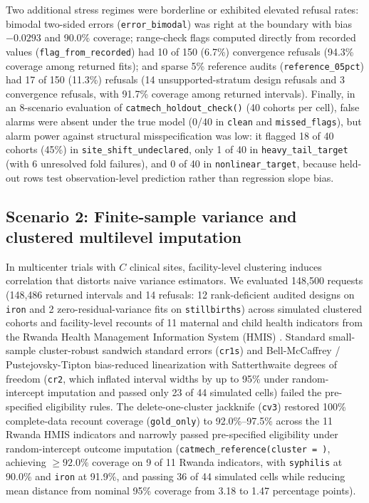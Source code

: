\documentclass[
]{article}
\begin{document}
Two additional stress regimes were borderline or exhibited elevated
refusal rates: bimodal two-sided errors (\texttt{error\_bimodal}) was
right at the boundary with bias \(-0.0293\) and 90.0\% coverage;
range-check flags computed directly from recorded values
(\texttt{flag\_from\_recorded}) had 10 of 150 (6.7\%) convergence
refusals (94.3\% coverage among returned fits); and sparse 5\% reference
audits (\texttt{reference\_05pct}) had 17 of 150 (11.3\%) refusals (14
unsupported-stratum design refusals and 3 convergence refusals, with
91.7\% coverage among returned intervals). Finally, in an 8-scenario
evaluation of \texttt{catmech\_holdout\_check()} (40 cohorts per cell),
false alarms were absent under the true model (0/40 in \texttt{clean}
and \texttt{missed\_flags}), but alarm power against structural
misspecification was low: it flagged 18 of 40 cohorts (45\%) in
\texttt{site\_shift\_undeclared}, only 1 of 40 in
\texttt{heavy\_tail\_target} (with 6 unresolved fold failures), and 0 of
40 in \texttt{nonlinear\_target}, because held-out rows test
observation-level prediction rather than regression slope bias.

\subsection{Scenario 2: Finite-sample variance and clustered multilevel
imputation}\label{scenario-2-finite-sample-variance-and-clustered-multilevel-imputation}

In multicenter trials with \(C\) clinical sites, facility-level
clustering induces correlation that distorts naive variance estimators.
We evaluated 148,500 requests (148,486 returned intervals and 14
refusals: 12 rank-deficient audited designs on \texttt{iron} and 2
zero-residual-variance fits on \texttt{stillbirths}) across simulated
clustered cohorts and facility-level recounts of 11 maternal and child
health indicators from the Rwanda Health Management Information System
(HMIS) \citep{nshimyiryo2020health}. Standard small-sample
cluster-robust sandwich standard errors (\texttt{cr1s}) and
Bell-McCaffrey / Pustejovsky-Tipton bias-reduced linearization with
Satterthwaite degrees of freedom (\texttt{cr2}, which inflated interval
widths by up to 95\% under random-intercept imputation and passed only
23 of 44 simulated cells) failed the pre-specified eligibility rules.
The delete-one-cluster jackknife (\texttt{cv3}) restored 100\%
complete-data recount coverage (\texttt{gold\_only}) to 92.0\%--97.5\%
across the 11 Rwanda HMIS indicators and narrowly passed pre-specified
eligibility under random-intercept outcome imputation
(\texttt{catmech\_reference(cluster\ =\ )}, achieving \(\ge 92.0\%\)
coverage on 9 of 11 Rwanda indicators, with \texttt{syphilis} at 90.0\%
and \texttt{iron} at 91.9\%, and passing 36 of 44 simulated cells while
reducing mean distance from nominal 95\% coverage from 3.18 to 1.47
percentage points).
\end{document}
